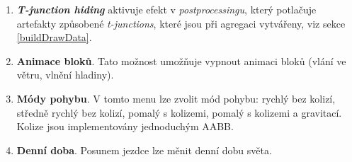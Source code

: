 \begin{enumerate}
	\item \textbf{\textit{T-junction hiding}} aktivuje efekt v \textit{postprocessingu}, který potlačuje artefakty způsobené \textit{t-junctions}, které jsou při agregaci vytvářeny, viz sekce \ref{buildDrawData}.
	
	\item \textbf{Animace bloků}. Tato možnost umožňuje vypnout animaci bloků (vlání ve větru, vlnění hladiny).

	\item \textbf{Módy pohybu}. V tomto menu lze zvolit mód pohybu: rychlý bez kolizí, středně rychlý bez kolizí, pomalý s kolizemi, pomalý s kolizemi a gravitací. Kolize jsou implementovány jednoduchým AABB.
	
	\item \textbf{Denní doba}. Posunem jezdce lze měnit denní dobu světa.
\end{enumerate}

